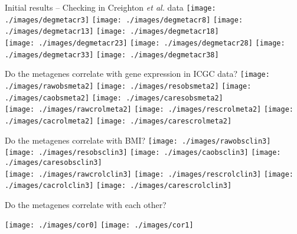 \documentclass[handout]{beamer}
\begin{document}
\begin{frame}{Initial results -- Checking in Creighton \textit{et al.} data}
	\texttt{[image: ./images/degmetacr3]}
	\texttt{[image: ./images/degmetacr8]}
	\texttt{[image: ./images/degmetacr13]}
	\texttt{[image: ./images/degmetacr18]}\\
	\texttt{[image: ./images/degmetacr23]}
	\texttt{[image: ./images/degmetacr28]}
	\texttt{[image: ./images/degmetacr33]}
	\texttt{[image: ./images/degmetacr38]}
\end{frame}

\begin{frame}{Do the metagenes correlate with gene expression in ICGC data?}
	\texttt{[image: ./images/rawobsmeta2]}
	\texttt{[image: ./images/resobsmeta2]}
	\texttt{[image: ./images/caobsmeta2]}
	\texttt{[image: ./images/caresobsmeta2]}\\
	\texttt{[image: ./images/rawcrolmeta2]}
	\texttt{[image: ./images/rescrolmeta2]}
	\texttt{[image: ./images/cacrolmeta2]}
	\texttt{[image: ./images/carescrolmeta2]}
\end{frame}

\begin{frame}{Do the metagenes correlate with BMI?}
	\texttt{[image: ./images/rawobsclin3]}
	\texttt{[image: ./images/resobsclin3]}
	\texttt{[image: ./images/caobsclin3]}
	\texttt{[image: ./images/caresobsclin3]}\\
	\texttt{[image: ./images/rawcrolclin3]}
	\texttt{[image: ./images/rescrolclin3]}
	\texttt{[image: ./images/cacrolclin3]}
	\texttt{[image: ./images/carescrolclin3]}
\end{frame}

\begin{frame}{Do the metagenes correlate with each other?}
	\begin{center}
		\texttt{[image: ./images/cor0]}
		\texttt{[image: ./images/cor1]}
	\end{center}
\end{frame}
\end{document}
